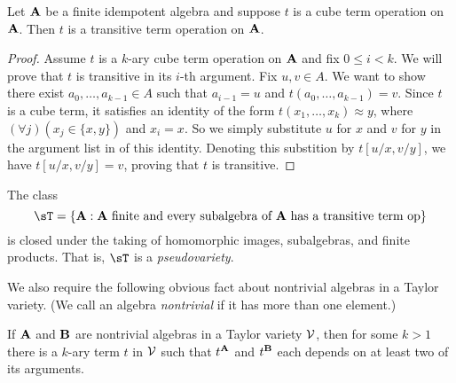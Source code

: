 

\begin{Fact}
  \label{fact:cubes-are-trans}
  Let $\mathbf{A}$ be a finite idempotent algebra and suppose $t$ is a cube term operation on $\mathbf{A}$.
  Then $t$ is a transitive term operation on $\mathbf{A}$.
\end{Fact}
\begin{proof}
  Assume $t$ is a $k$-ary cube term operation on $\mathbf{A}$ and fix $0\leq i<k$.  We will prove that $t$
  is transitive in its $i$-th argument.  Fix $u, v \in A$.
  We want to show there exist $a_0,\dots, a_{k-1} \in A$ such that $a_{i-1} = u$
  and $t(a_0 ,\dots, a_{k-1}) = v$. Since $t$ is a cube term, it satisfies an identity of the form
    $t(x_1, \dots, x_k) \approx y$,
  where $(\forall j)(x_j \in \{x, y\})$ and $x_i = x$.
  So we simply substitute $u$ for $x$ and $v$ for $y$ in 
  the argument list in of this identity. %
  Denoting this substition by $t[u/x, v/y]$, we have
  $t[u/x, v/y]= v$, proving that $t$ is transitive.
\end{proof}

\begin{Fact}
  \label{fact:pseudovar}
  The class
  \begin{equation}
    \label{eq:0001}
    \sT = \{\bA : \bA \text{ finite and every subalgebra of $\bA$ has a transitive term op}\}
  \end{equation}
  is closed under the taking of homomorphic images, %
  subalgebras,  %
  and finite products. %
  That is, $\sT$ is a \emph{pseudovariety}.
\end{Fact}


We also require the following obvious fact about
nontrivial algebras in a Taylor variety. (We call an algebra \emph{nontrivial}
if it has more than one element.)
\begin{Fact}
  \label{fact:nonconstant-terms-exist}
  If $\mathbf{A}$ and $\mathbf{B}$ are nontrivial algebras in a Taylor variety $\mathcal{V}$, then for
  some $k>1$ there is a $k$-ary term $t$ in $\mathcal{V}$ such that $t^{\mathbf{A}}$ and
  $t^{\mathbf{B}}$ each depends on at least two of its arguments.
\end{Fact}


